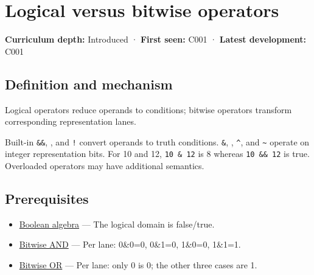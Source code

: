 \hypertarget{appendix-fe6b457d68d8}{}\label{referencestart:appendix-fe6b457d68d8}
\section{Logical versus bitwise operators}\label{appendix-fe6b457d68d8-logical-versus-bitwise-operators}

\hypertarget{appendix-fe6b457d68d8-logical-versus-bitwise-operators}{}

\textbf{Curriculum depth:} Introduced · \textbf{First seen:} C001 · \textbf{Latest development:} C001

\begin{allmightroledefinition}

\subsection{Definition and mechanism}\label{appendix-fe6b457d68d8-definition-and-mechanism}

\hypertarget{appendix-fe6b457d68d8-definition-and-mechanism}{}

Logical operators reduce operands to conditions; bitwise operators transform corresponding representation lanes.

\end{allmightroledefinition}

Built-in \texttt{\&\&}, \texttt{\textbar{}\textbar{}}, and \texttt{!} convert operands to truth conditions. \texttt{\&}, \texttt{\textbar{}}, \texttt{\^{}}, and \texttt{\textasciitilde{}} operate on integer representation bits. For 10 and 12, \texttt{10\ \&\ 12} is 8 whereas \texttt{10\ \&\&\ 12} is true. Overloaded operators may have additional semantics.

\subsection{Prerequisites}\label{appendix-fe6b457d68d8-prerequisites}

\hypertarget{appendix-fe6b457d68d8-prerequisites}{}

\begin{itemize}
\tightlist
\item
  \hyperref[appendix-24475e1596a8]{Boolean algebra} --- The logical domain is false/true.
\item
  \hyperref[appendix-68b52453737c]{Bitwise AND} --- Per lane: 0\&0=0, 0\&1=0, 1\&0=0, 1\&1=1.
\item
  \hyperref[appendix-a427ce8ce8a6]{Bitwise OR} --- Per lane: only 0 is 0; the other three cases are 1.
\end{itemize}

